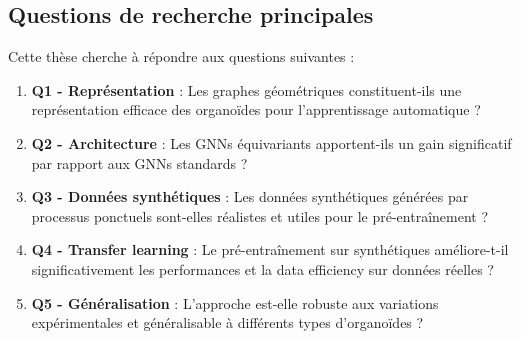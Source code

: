 \subsection{Questions de recherche principales}

Cette thèse cherche à répondre aux questions suivantes :

\begin{enumerate}
    \item \textbf{Q1 - Représentation} : Les graphes géométriques constituent-ils une représentation efficace des organoïdes pour l'apprentissage automatique ?
    
    \item \textbf{Q2 - Architecture} : Les GNNs équivariants apportent-ils un gain significatif par rapport aux GNNs standards ?
    
    \item \textbf{Q3 - Données synthétiques} : Les données synthétiques générées par processus ponctuels sont-elles réalistes et utiles pour le pré-entraînement ?
    
    \item \textbf{Q4 - Transfer learning} : Le pré-entraînement sur synthétiques améliore-t-il significativement les performances et la data efficiency sur données réelles ?
    
    \item \textbf{Q5 - Généralisation} : L'approche est-elle robuste aux variations expérimentales et généralisable à différents types d'organoïdes ?
\end{enumerate}
